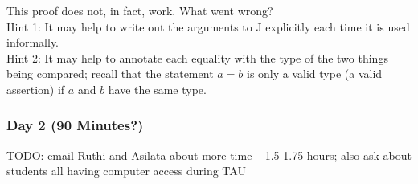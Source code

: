 \documentclass{article}
\begin{document}
\begin{itemize}
\begin{itemize}
        This proof does not, in fact, work.  What went wrong? \\
        Hint 1: It may help to write out the arguments to J explicitly each time it is used informally. \\
        Hint 2: It may help to annotate each equality with the type of the two things being compared; recall that the statement $a = b$ is only a valid type (a valid assertion) if $a$ and $b$ have the same type.
    \end{itemize}
\end{itemize}

\subsubsection*{Day 2 (90 Minutes?)}
TODO: email Ruthi and Asilata about more time -- 1.5-1.75 hours; also ask about students all having computer access during TAU
\end{document}
